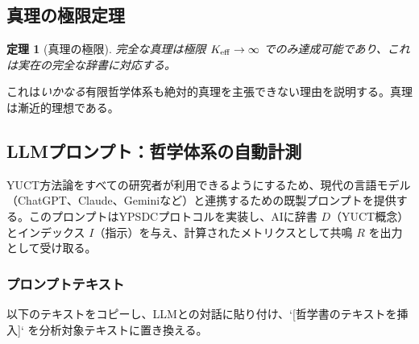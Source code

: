\documentclass[11pt,a4paper]{article}
\newtheorem{theorem}{定理}[section]
\begin{document}
	\subsection{真理の極限定理}
	
	\begin{theorem}[真理の極限]
		完全な真理は極限 \(\Keff \to \infty\) でのみ達成可能であり、これは実在の完全な辞書に対応する。
	\end{theorem}
	
	これは\emph{いかなる}有限哲学体系も絶対的真理を主張できない理由を説明する。真理は漸近的理想である。
	
	\subsection{LLMプロンプト：哲学体系の自動計測}
	\label{sec:llm-prompt}
	
	YUCT方法論をすべての研究者が利用できるようにするため、現代の言語モデル（ChatGPT、Claude、Geminiなど）と連携するための既製プロンプトを提供する。このプロンプトはYPSDCプロトコルを実装し、AIに辞書 \(D\)（YUCT概念）とインデックス \(I\)（指示）を与え、計算されたメトリクスとして共鳴 \(R\) を出力として受け取る。
	
	\subsubsection{プロンプトテキスト}
	
	以下のテキストをコピーし、LLMとの対話に貼り付け、`[哲学書のテキストを挿入]` を分析対象テキストに置き換える。
	
\end{document}
